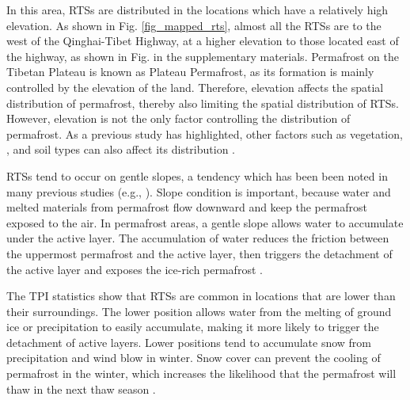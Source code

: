 \documentclass[authoryear,preprint,review,12pt]{elsarticle}
\begin{document}




In this area, RTSs are distributed in the locations which have a relatively high elevation.
As shown in Fig. \ref{fig_mapped_rts}, almost all the RTSs are to the west of the Qinghai-Tibet Highway, at a higher elevation to those located east of the highway, as shown in Fig.  in the supplementary materials. Permafrost on the Tibetan Plateau is known as Plateau Permafrost, as its formation is mainly controlled by the elevation of the land. Therefore, elevation affects the spatial distribution of permafrost, thereby also limiting the spatial distribution of RTSs. However, elevation is not the only factor controlling the distribution of permafrost. As a previous study has highlighted, other factors such as vegetation, , and soil types can also affect its distribution \citep{yin2017effects}.

RTSs tend to occur on gentle slopes, a tendency which has been been noted in many previous studies (e.g., \citealp{leibman1995cryogenic, niu2014thaw, lacelle_distribution_2015}). Slope condition is important, because water and melted materials from permafrost flow downward and keep the permafrost exposed to the air. In permafrost areas, a gentle slope allows water to accumulate under the active layer. The accumulation of water reduces the friction between the uppermost permafrost and the active layer,  then triggers the detachment of the active layer and exposes the ice-rich permafrost \citep{mcroberts1974stability, mcroberts1974the}. 

The TPI statistics show that RTSs are common in locations that are lower than their surroundings. The lower position allows water from the melting of ground ice or precipitation to easily accumulate, making it more likely to trigger the detachment of active layers. Lower positions tend to accumulate snow from precipitation and wind blow in winter. Snow cover can prevent the cooling of permafrost in the winter, which increases the likelihood that the permafrost will thaw in the next thaw season . 
\end{document}
